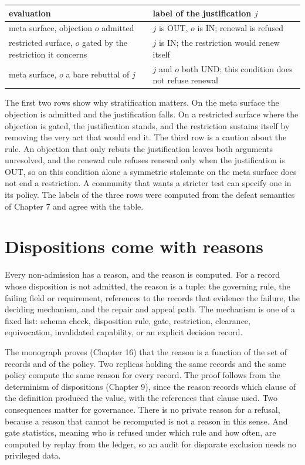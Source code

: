 \documentclass[11pt]{article}
\newcommand{\IN}{\textsf{IN}}
\newcommand{\UND}{\textsf{UND}}
\newcommand{\OUT}{\textsf{OUT}}
\begin{document}
\begin{center}
\small
\begin{tabularx}{\textwidth}{@{}>{\raggedright\arraybackslash}p{} X@{}}
\toprule
evaluation & label of the justification $j$\\
\midrule
meta surface, objection $o$ admitted & $j$ is \OUT{}, $o$ is \IN{}; renewal is refused\\
restricted surface, $o$ gated by the restriction it concerns & $j$ is \IN{}; the restriction would renew itself\\
meta surface, $o$ a bare rebuttal of $j$ & $j$ and $o$ both \UND{}; this condition does not refuse renewal\\
\bottomrule
\end{tabularx}
\end{center}

The first two rows show why stratification matters. On the meta surface the objection is admitted and the justification falls. On a restricted surface where the objection is gated, the justification stands, and the restriction sustains itself by removing the very act that would end it. The third row is a caution about the rule. An objection that only rebuts the justification leaves both arguments unresolved, and the renewal rule refuses renewal only when the justification is \OUT{}, so on this condition alone a symmetric stalemate on the meta surface does not end a restriction. A community that wants a stricter test can specify one in its policy. The labels of the three rows were computed from the defeat semantics of Chapter 7 and agree with the table.

\section{Dispositions come with reasons}\label{sec:reasons}

Every non-admission has a reason, and the reason is computed. For a record whose disposition is not admitted, the reason is a tuple: the governing rule, the failing field or requirement, references to the records that evidence the failure, the deciding mechanism, and the repair and appeal path. The mechanism is one of a fixed list: schema check, disposition rule, gate, restriction, clearance, equivocation, invalidated capability, or an explicit decision record.

The monograph proves (Chapter 16) that the reason is a function of the set of records and of the policy. Two replicas holding the same records and the same policy compute the same reason for every record. The proof follows from the determinism of dispositions (Chapter 9), since the reason records which clause of the definition produced the value, with the references that clause used. Two consequences matter for governance. There is no private reason for a refusal, because a reason that cannot be recomputed is not a reason in this sense. And gate statistics, meaning who is refused under which rule and how often, are computed by replay from the ledger, so an audit for disparate exclusion needs no privileged data.
\end{document}
